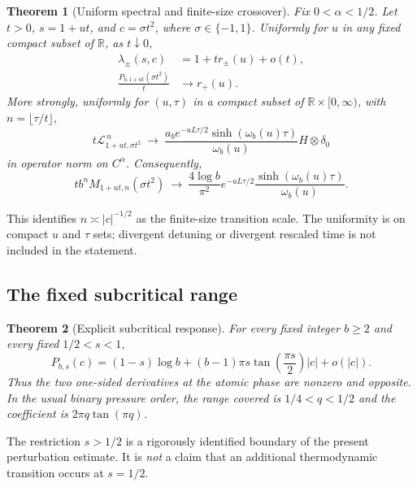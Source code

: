 \documentclass[11pt,a4paper]{article}
\numberwithin{equation}{section}
\newtheorem{theorem}{Theorem}[section]
\theoremstyle{definition}
\theoremstyle{remark}
\newcommand{\RR}{\mathbb R}
\newcommand{\Lop}{\mathcal L}
\begin{document}
\begin{theorem}[Uniform spectral and finite-size crossover]
\label{thm:crossover}
Fix $0<\alpha<1/2$. Let $t>0$, $s=1+ut$, and $c=\sigma t^2$, where
$\sigma\in\{-1,1\}$. Uniformly for $u$ in any fixed compact subset of
$\RR$, as $t\downarrow0$,
\begin{align}
 \lambda_\pm(s,c)&=1+t r_\pm(u)+o(t),\\
 \frac{P_{b,1+ut}(\sigma t^2)}{t}&\longrightarrow r_+(u).
 \label{eq:pressure-crossover}
\end{align}
More strongly, uniformly for $(u,\tau)$ in a compact subset of
$\RR\times[0,\infty)$, with $n=\lfloor\tau/t\rfloor$,
\begin{equation}
 t\Lop_{1+ut,\sigma t^2}^{\,n}\ \longrightarrow\
 \frac{a_b e^{-uL\tau/2}\sinh(\omega_b(u)\tau)}{\omega_b(u)}
 H\otimes\delta_0
 \label{eq:operator-crossover}
\end{equation}
in operator norm on $C^\alpha$. Consequently,
\begin{equation}
 t b^nM_{1+ut,n}(\sigma t^2)\ \longrightarrow\
 \frac{4\log b}{\pi^2}
 e^{-uL\tau/2}\frac{\sinh(\omega_b(u)\tau)}{\omega_b(u)}.
 \label{eq:moment-crossover}
\end{equation}
\end{theorem}
This identifies $n\asymp |c|^{-1/2}$ as the finite-size transition scale.
The uniformity is on compact $u$ and $\tau$ sets; divergent detuning or
divergent rescaled time is not included in the statement.

\subsection{The fixed subcritical range}
\begin{theorem}[Explicit subcritical response]
\label{thm:subcritical}
For every fixed integer $b\ge2$ and every fixed $1/2<s<1$,
\begin{equation}
 P_{b,s}(c)=(1-s)\log b+
 (b-1)\pi s\tan\left(\frac{\pi s}{2}\right)|c|+o(|c|).
 \label{eq:subcritical}
\end{equation}
Thus the two one-sided derivatives at the atomic phase are nonzero and
opposite. In the usual binary pressure order, the range covered is
$1/4<q<1/2$ and the coefficient is
$2\pi q\tan(\pi q)$.
\end{theorem}
The restriction $s>1/2$ is a rigorously identified boundary of the present
perturbation estimate. It is \emph{not} a claim that an additional
thermodynamic transition occurs at $s=1/2$.
\end{document}
